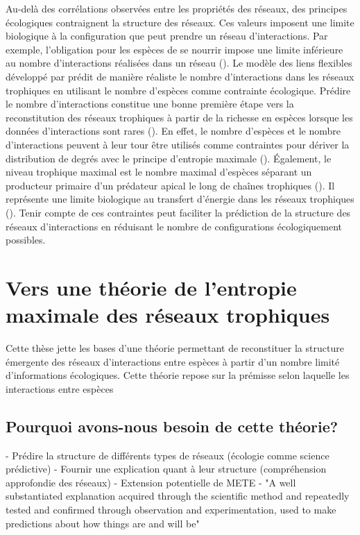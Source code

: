 Au-delà des corrélations observées entre les propriétés des réseaux, des
principes écologiques contraignent la structure des réseaux. Ces valeurs
imposent une limite biologique à la configuration que peut prendre un réseau
d'interactions. Par exemple, l'obligation pour les espèces de se nourrir impose
une limite inférieure au nombre d'interactions réalisées dans un réseau
(\cite{MacDonald2020Revisiting}). Le modèle des liens flexibles développé par
\cite{MacDonald2020Revisiting} prédit de manière réaliste le nombre
d'interactions dans les réseaux trophiques en utilisant le nombre d'espèces
comme contrainte écologique. Prédire le nombre d'interactions constitue une
bonne première étape vers la reconstitution des réseaux trophiques à partir de
la richesse en espèces lorsque les données d'interactions sont rares
(\cite{Strydom2021Roadmapa}). En effet, le nombre d'espèces et le nombre
d'interactions peuvent à leur tour être utilisés comme contraintes pour dériver
la distribution de degrés avec le principe d'entropie maximale
(\cite{Williams2011Biology}). Également, le niveau trophique maximal est le
nombre maximal d'espèces séparant un producteur primaire d'un prédateur apical
le long de chaînes trophiques (\cite{Cohen1978Food}). Il représente une limite
biologique au transfert d'énergie dans les réseaux trophiques
(\cite{Williams2004Limits}). Tenir compte de ces contraintes peut faciliter la
prédiction de la structure des réseaux d'interactions en réduisant le nombre de
configurations écologiquement possibles.  


\section{Vers une théorie de l'entropie maximale des réseaux trophiques}

Cette thèse jette les bases d'une théorie permettant de reconstituer la
structure émergente des réseaux d'interactions entre espèces à partir d'un
nombre limité d'informations écologiques. Cette théorie repose sur la prémisse
selon laquelle les interactions entre espèces 

\subsection{Pourquoi avons-nous besoin de cette théorie?} 

- Prédire la structure de différents types de réseaux (écologie comme science prédictive)
- Fournir une explication quant à leur structure (compréhension approfondie des réseaux)
- Extension potentielle de METE
- "A well substantiated explanation acquired through the scientific method 
and repeatedly tested and confirmed through observation and experimentation, 
used to make predictions about how things are and will be"

